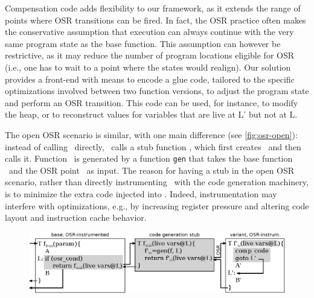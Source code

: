 
Compensation code adds flexibility to our framework, as it extends the range of points where OSR transitions can be fired. In fact, the OSR practice often makes the conservative assumption that execution can always continue with the very same program state as the base function. %
This assumption can however be restrictive, as it may reduce the number of program locations eligible for OSR (i.e., one has to wait to a point where the states would realign). Our solution provides a front-end with means to encode a glue code, tailored to the specific optimizations involved between two function versions, to adjust the program state and perform an OSR transition. This code can be used, for instance, to modify the heap, or to reconstruct values for variables that are live at \textsf{L'} but not at \textsf{L}.

The open OSR scenario is similar, with one main difference (see \myfigure\ref{fig:osr-open}): instead of calling \fosrto\ directly, \fosrfrom\ calls a stub function \fstub, which first creates \fosrto\ and then calls it. Function \fosrto\ is generated by a function {\tt gen} that takes the base function \fbase\ and the OSR point \osrpoint\ as input. The reason for having a stub in the open OSR scenario, rather than directly instrumenting \fbase\ with the code generation machinery, is to minimize the extra code injected into \fbase. Indeed, instrumentation may interfere with optimizations, e.g., by increasing register pressure and altering code layout and instruction cache behavior.


\ifdefined\noauthorea
\begin{figure}[t]
\begin{center}
\includegraphics[width=1.0\textwidth]{figures/osr-open/osr-open.eps}
\caption{\protect}
\end{center}
\end{figure}
\fi

